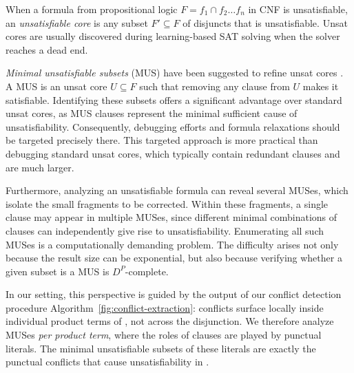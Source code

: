 When a formula from propositional logic \(F= f_1 \cap f_2 \dots f_n\) in CNF is unsatisfiable, an \emph{unsatisfiable core} is any subset \(F'\subseteq F\) of disjuncts that is unsatisfiable. Unsat cores are usually discovered during learning-based SAT solving when the solver reaches a dead end.

\emph{Minimal unsatisfiable subsets} (MUS) have been suggested to refine unsat cores \cite{Liffiton2008MUS}. A MUS is an unsat core \(U\subseteq F\) such that removing any clause from \(U\) makes it satisfiable. Identifying these subsets offers a significant advantage over standard unsat cores, as MUS clauses represent the minimal sufficient cause of unsatisfiability. Consequently, debugging efforts and formula relaxations should be targeted precisely there. This targeted approach is more practical than debugging standard unsat cores, which typically contain redundant clauses and are much larger.

Furthermore, analyzing an unsatisfiable formula can reveal several MUSes, which isolate the small fragments to be corrected. Within these fragments, a single clause may appear in multiple MUSes, since different minimal combinations of clauses can independently give rise to unsatisfiability. Enumerating all such MUSes is a computationally demanding problem. The difficulty arises not only because the result size can be exponential, but also because verifying whether a given subset is a MUS is \(D^P\)-complete.


In our setting, this perspective is guided by the output of our conflict detection procedure Algorithm~\ref{fig:conflict-extraction}: conflicts surface locally inside individual product terms of \dpnf, not across the disjunction. We therefore analyze MUSes \emph{per product term}, where the roles of clauses are played by punctual literals. The minimal unsatisfiable subsets of these literals are exactly the punctual conflicts that cause unsatisfiability in \TDDLfm.

